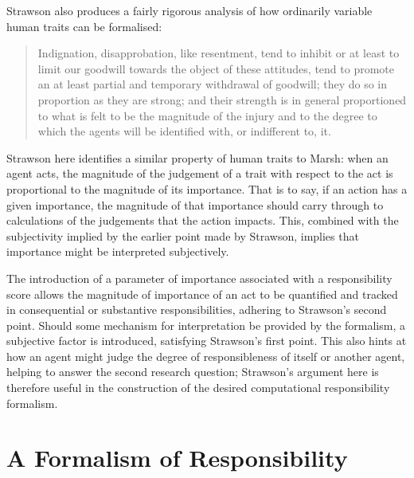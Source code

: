 Strawson also produces a fairly rigorous analysis of how ordinarily variable human traits can be formalised:

\begin{quotation}
    Indignation, disapprobation, like resentment, tend to inhibit or at least to limit our goodwill towards the object of these attitudes, tend to promote an at least partial and temporary withdrawal of goodwill; they do so in proportion as they are strong; and their strength is in general proportioned to what is felt to be the magnitude of the injury and to the degree to which the agents will be identified with, or indifferent to, it.\cite{strawson}
\end{quotation}

Strawson here identifies a similar property of human traits to Marsh: when an agent acts, the magnitude of the judgement of a trait with respect to the act is proportional to the magnitude of its importance. That is to say, if an action has a given importance, the magnitude of that importance should carry through to calculations of the judgements that the action impacts. This, combined with the subjectivity implied by the earlier point made by Strawson, implies that importance might be interpreted subjectively.\par

The introduction of a parameter of importance associated with a responsibility score allows the magnitude of importance of an act to be quantified and tracked in consequential or substantive responsibilities, adhering to Strawson's second point. Should some mechanism for interpretation be provided by the formalism, a subjective factor is introduced, satisfying Strawson's first point. This also hints at how an agent might judge the degree of responsibleness of itself or another agent, helping to answer the second research question; Strawson's argument here is therefore useful in the construction of the desired computational responsibility formalism.\par



\section{A Formalism of Responsibility}

